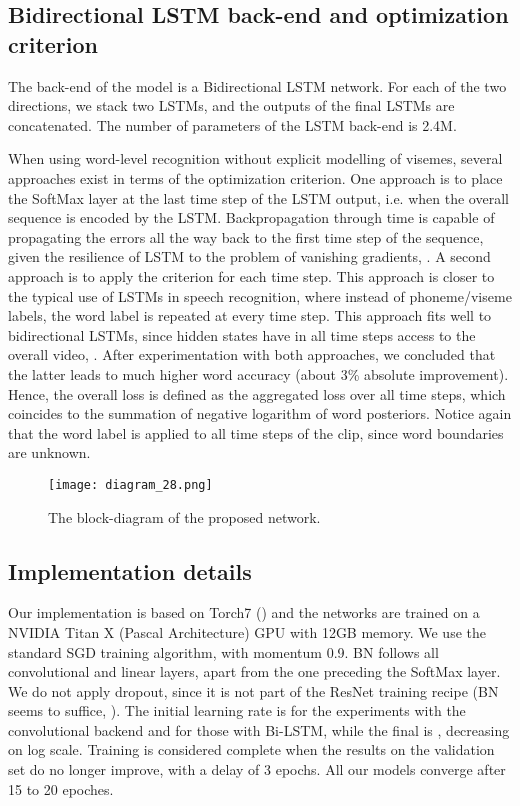 \documentclass[a4paper]{article}
\begin{document}
\subsection{Bidirectional LSTM back-end and optimization criterion}
The back-end of the model is a Bidirectional LSTM network. For each of the two directions, we stack two LSTMs, and the outputs of the final LSTMs are concatenated. The number of parameters of the LSTM back-end is 2.4M. 

When using word-level recognition without explicit modelling of visemes, several approaches exist in terms of the optimization criterion. One approach is to place the SoftMax layer at the last time step of the LSTM output, i.e. when the overall sequence is encoded by the LSTM. Backpropagation through time is capable of propagating the errors all the way back to the first time step of the sequence, given the resilience of LSTM to the problem of vanishing gradients, \cite{wand2016lipreading}. A second approach is to apply the criterion for each time step. This approach is closer to the typical use of LSTMs in speech recognition, where instead of phoneme/viseme labels, the word label is repeated at every time step. This approach fits well to bidirectional LSTMs, since hidden states have in all time steps access to the overall video, \cite{graves2005bidirectional}. After experimentation with both approaches, we concluded that the latter leads to much higher word accuracy (about 3\% absolute improvement). Hence, the overall loss is defined as the aggregated loss over all time steps, which coincides to the summation of negative logarithm of word posteriors. Notice again that the word label is applied to all time steps of the clip, since word boundaries are unknown. 
\begin{figure}[!htbp]
\centering
\texttt{[image: diagram\_28.png]}
\vspace{-2mm}\caption{The block-diagram of the proposed network.}
\label{diagram}
\end{figure}
\subsection{Implementation details}
Our implementation is based on Torch7 (\cite{torch7}) and the networks are trained on a NVIDIA Titan X (Pascal Architecture) GPU with 12GB memory. We use the standard SGD training algorithm, with momentum 0.9. BN follows all convolutional and linear layers, apart from the one preceding the SoftMax layer. We do not apply dropout, since it is not part of the ResNet training recipe (BN seems to suffice, \cite{ioffe2015batch}). The initial learning rate is  for the experiments with the convolutional backend and  for those with Bi-LSTM, while the final is , decreasing on log scale. Training is considered complete when the results on the validation set do no longer improve, with a delay of 3 epochs. All our models converge after 15 to 20 epoches. 
\end{document}
